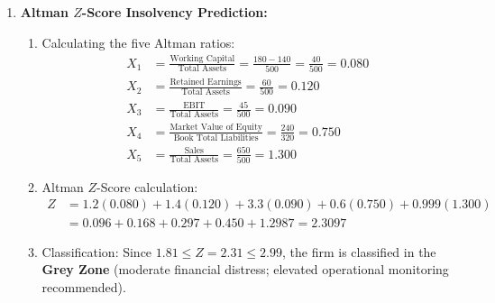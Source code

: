 \begin{enumerate}[label=\textbf{P7.\arabic*}]
    \item \textbf{Altman $Z$-Score Insolvency Prediction:}
    \begin{enumerate}[label=(\alph*)]
        \item Calculating the five Altman ratios:
        \begin{align*}
        X_1 &= \frac{\text{Working Capital}}{\text{Total Assets}} = \frac{180 - 140}{500} = \frac{40}{500} = \mathbf{0.080} \\
        X_2 &= \frac{\text{Retained Earnings}}{\text{Total Assets}} = \frac{60}{500} = \mathbf{0.120} \\
        X_3 &= \frac{\text{EBIT}}{\text{Total Assets}} = \frac{45}{500} = \mathbf{0.090} \\
        X_4 &= \frac{\text{Market Value of Equity}}{\text{Book Total Liabilities}} = \frac{240}{320} = \mathbf{0.750} \\
        X_5 &= \frac{\text{Sales}}{\text{Total Assets}} = \frac{650}{500} = \mathbf{1.300}
        \end{align*}
        \item Altman $Z$-Score calculation:
        \begin{align*}
        Z &= 1.2(0.080) + 1.4(0.120) + 3.3(0.090) + 0.6(0.750) + 0.999(1.300) \\
        &= 0.096 + 0.168 + 0.297 + 0.450 + 1.2987 = \mathbf{2.3097}
        \end{align*}
        \item Classification: Since $1.81 \le Z = 2.31 \le 2.99$, the firm is classified in the \textcolor{amberwarning}{\textbf{Grey Zone}} (moderate financial distress; elevated operational monitoring recommended).
    \end{enumerate}


\end{enumerate}
